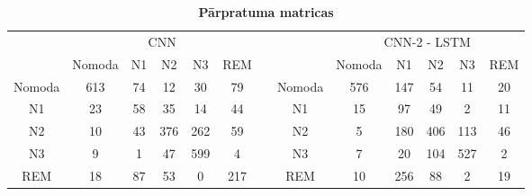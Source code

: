 \documentclass[12pt,paper=A4]{report}
\begin{document}
\begin{table}[H]
\centering
\caption{}
\captionsetup{justification=centering}
\caption*{\textbf{Pārpratuma matricas}}
\begin{tabular}{cccccclcccccc}
\multicolumn{1}{l}{} & \multicolumn{5}{c}{CNN} &  & \multicolumn{1}{l}{} & \multicolumn{5}{c}{CNN-2 - LSTM} \\ \cline{2-6} \cline{9-13} 
\multicolumn{1}{l|}{} & \multicolumn{1}{c|}{Nomoda} & \multicolumn{1}{c|}{N1} & \multicolumn{1}{c|}{N2} & \multicolumn{1}{c|}{N3} & \multicolumn{1}{c|}{REM} &  & \multicolumn{1}{l|}{} & \multicolumn{1}{c|}{Nomoda} & \multicolumn{1}{c|}{N1} & \multicolumn{1}{c|}{N2} & \multicolumn{1}{c|}{N3} & \multicolumn{1}{c|}{REM} \\ \cline{1-6} \cline{8-13} 
\multicolumn{1}{|c|}{Nomoda} & \multicolumn{1}{c|}{\cellcolor[HTML]{FFFFC7}613} & \multicolumn{1}{c|}{74} & \multicolumn{1}{c|}{12} & \multicolumn{1}{c|}{30} & \multicolumn{1}{c|}{79} & \multicolumn{1}{l|}{} & \multicolumn{1}{c|}{Nomoda} & \multicolumn{1}{c|}{\cellcolor[HTML]{FFFFC7}576} & \multicolumn{1}{c|}{147} & \multicolumn{1}{c|}{54} & \multicolumn{1}{c|}{11} & \multicolumn{1}{c|}{20} \\ \cline{1-6} \cline{8-13} 
\multicolumn{1}{|c|}{N1} & \multicolumn{1}{c|}{23} & \multicolumn{1}{c|}{\cellcolor[HTML]{FFFFC7}58} & \multicolumn{1}{c|}{35} & \multicolumn{1}{c|}{14} & \multicolumn{1}{c|}{44} & \multicolumn{1}{l|}{} & \multicolumn{1}{c|}{N1} & \multicolumn{1}{c|}{15} & \multicolumn{1}{c|}{\cellcolor[HTML]{FFFFC7}97} & \multicolumn{1}{c|}{49} & \multicolumn{1}{c|}{2} & \multicolumn{1}{c|}{11} \\ \cline{1-6} \cline{8-13} 
\multicolumn{1}{|c|}{N2} & \multicolumn{1}{c|}{10} & \multicolumn{1}{c|}{43} & \multicolumn{1}{c|}{\cellcolor[HTML]{FFFFC7}376} & \multicolumn{1}{c|}{262} & \multicolumn{1}{c|}{59} & \multicolumn{1}{l|}{} & \multicolumn{1}{c|}{N2} & \multicolumn{1}{c|}{5} & \multicolumn{1}{c|}{180} & \multicolumn{1}{c|}{\cellcolor[HTML]{FFFFC7}406} & \multicolumn{1}{c|}{113} & \multicolumn{1}{c|}{46} \\ \cline{1-6} \cline{8-13} 
\multicolumn{1}{|c|}{N3} & \multicolumn{1}{c|}{9} & \multicolumn{1}{c|}{1} & \multicolumn{1}{c|}{47} & \multicolumn{1}{c|}{\cellcolor[HTML]{FFFFC7}599} & \multicolumn{1}{c|}{4} & \multicolumn{1}{l|}{} & \multicolumn{1}{c|}{N3} & \multicolumn{1}{c|}{7} & \multicolumn{1}{c|}{20} & \multicolumn{1}{c|}{104} & \multicolumn{1}{c|}{\cellcolor[HTML]{FFFFC7}527} & \multicolumn{1}{c|}{2} \\ \cline{1-6} \cline{8-13} 
\multicolumn{1}{|c|}{REM} & \multicolumn{1}{c|}{18} & \multicolumn{1}{c|}{87} & \multicolumn{1}{c|}{53} & \multicolumn{1}{c|}{0} & \multicolumn{1}{c|}{\cellcolor[HTML]{FFFFC7}217} & \multicolumn{1}{l|}{} & \multicolumn{1}{c|}{REM} & \multicolumn{1}{c|}{10} & \multicolumn{1}{c|}{256} & \multicolumn{1}{c|}{88} & \multicolumn{1}{c|}{2} & \multicolumn{1}{c|}{\cellcolor[HTML]{FFFFC7}19} \\ \cline{1-6} \cline{8-13} 
\end{tabular}
\label{matrixOfConf2000}
\end{table}
\end{document}
